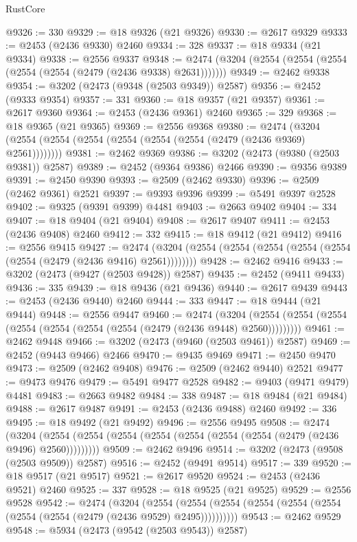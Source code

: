 \begin{lexlean}{RustCore}
\begin{coremodule}
@9326 := 330
@9329 := @18 @9326 (@21 @9326)
@9330 := @2617 @9329
@9333 := @2453 (@2436 @9330) @2460
@9334 := 328
@9337 := @18 @9334 (@21 @9334)
@9338 := @2556 @9337
@9348 := @2474 (@3204 (@2554 (@2554 (@2554 (@2554 (@2554 (@2479 (@2436 @9338) @2631)))))))
@9349 := @2462 @9338
@9354 := @3202 (@2473 (@9348 (@2503 @9349)) @2587)
@9356 := @2452 (@9333 @9354)
@9357 := 331
@9360 := @18 @9357 (@21 @9357)
@9361 := @2617 @9360
@9364 := @2453 (@2436 @9361) @2460
@9365 := 329
@9368 := @18 @9365 (@21 @9365)
@9369 := @2556 @9368
@9380 := @2474 (@3204 (@2554 (@2554 (@2554 (@2554 (@2554 (@2554 (@2479 (@2436 @9369) @2561))))))))
@9381 := @2462 @9369
@9386 := @3202 (@2473 (@9380 (@2503 @9381)) @2587)
@9389 := @2452 (@9364 @9386) @2466
@9390 := @9356 @9389
@9391 := @2450 @9390
@9393 := @2509 (@2462 @9330)
@9396 := @2509 (@2462 @9361) @2521
@9397 := @9393 @9396
@9399 := @5491 @9397 @2528
@9402 := @9325 (@9391 @9399) @4481
@9403 := @2663 @9402
@9404 := 334
@9407 := @18 @9404 (@21 @9404)
@9408 := @2617 @9407
@9411 := @2453 (@2436 @9408) @2460
@9412 := 332
@9415 := @18 @9412 (@21 @9412)
@9416 := @2556 @9415
@9427 := @2474 (@3204 (@2554 (@2554 (@2554 (@2554 (@2554 (@2554 (@2479 (@2436 @9416) @2561))))))))
@9428 := @2462 @9416
@9433 := @3202 (@2473 (@9427 (@2503 @9428)) @2587)
@9435 := @2452 (@9411 @9433)
@9436 := 335
@9439 := @18 @9436 (@21 @9436)
@9440 := @2617 @9439
@9443 := @2453 (@2436 @9440) @2460
@9444 := 333
@9447 := @18 @9444 (@21 @9444)
@9448 := @2556 @9447
@9460 := @2474
    (@3204 (@2554 (@2554 (@2554 (@2554 (@2554 (@2554 (@2554 (@2479 (@2436 @9448) @2560)))))))))
@9461 := @2462 @9448
@9466 := @3202 (@2473 (@9460 (@2503 @9461)) @2587)
@9469 := @2452 (@9443 @9466) @2466
@9470 := @9435 @9469
@9471 := @2450 @9470
@9473 := @2509 (@2462 @9408)
@9476 := @2509 (@2462 @9440) @2521
@9477 := @9473 @9476
@9479 := @5491 @9477 @2528
@9482 := @9403 (@9471 @9479) @4481
@9483 := @2663 @9482
@9484 := 338
@9487 := @18 @9484 (@21 @9484)
@9488 := @2617 @9487
@9491 := @2453 (@2436 @9488) @2460
@9492 := 336
@9495 := @18 @9492 (@21 @9492)
@9496 := @2556 @9495
@9508 := @2474
    (@3204 (@2554 (@2554 (@2554 (@2554 (@2554 (@2554 (@2554 (@2479 (@2436 @9496) @2560)))))))))
@9509 := @2462 @9496
@9514 := @3202 (@2473 (@9508 (@2503 @9509)) @2587)
@9516 := @2452 (@9491 @9514)
@9517 := 339
@9520 := @18 @9517 (@21 @9517)
@9521 := @2617 @9520
@9524 := @2453 (@2436 @9521) @2460
@9525 := 337
@9528 := @18 @9525 (@21 @9525)
@9529 := @2556 @9528
@9542 := @2474
    (@3204
      (@2554 (@2554 (@2554 (@2554 (@2554 (@2554 (@2554 (@2554 (@2479 (@2436 @9529) @2495))))))))))
@9543 := @2462 @9529
@9548 := @5934 (@2473 (@9542 (@2503 @9543)) @2587)

\end{coremodule}
\end{lexlean}
